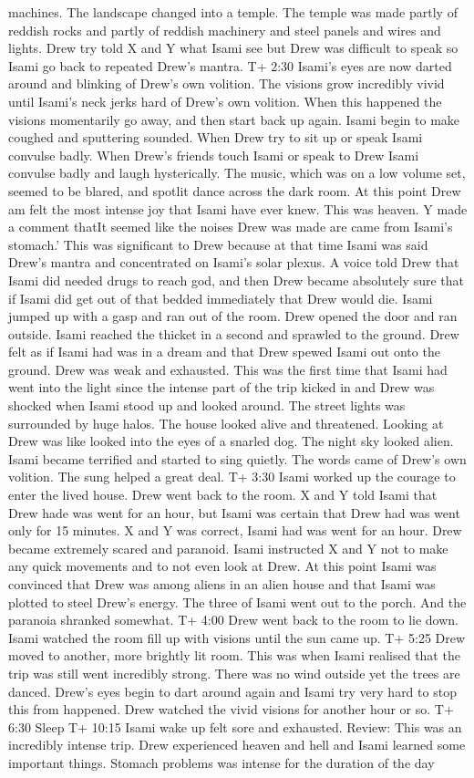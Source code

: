 \documentclass[12pt]{book}
\begin{document}
machines. The landscape changed into a temple. The temple was made partly of reddish rocks and partly of reddish machinery and steel panels and wires and lights. Drew try told X and Y what Isami see but Drew was difficult to speak so Isami go back to repeated Drew's mantra. T+ 2:30 Isami's eyes are now darted around and blinking of Drew's own volition. The visions grow incredibly vivid until Isami's neck jerks hard of Drew's own volition. When this happened the visions momentarily go away, and then start back up again. Isami begin to make coughed and sputtering sounded. When Drew try to sit up or speak Isami convulse badly. When Drew's friends touch Isami or speak to Drew Isami convulse badly and laugh hysterically. The music, which was on a low volume set, seemed to be blared, and spotlit dance across the dark room. At this point Drew am felt the most intense joy that Isami have ever knew. This was heaven. Y made a comment thatIt seemed like the noises Drew was made are came from Isami's stomach.' This was significant to Drew because at that time Isami was said Drew's mantra and concentrated on Isami's solar plexus. A voice told Drew that Isami did needed drugs to reach god, and then Drew became absolutely sure that if Isami did get out of that bedded immediately that Drew would die. Isami jumped up with a gasp and ran out of the room. Drew opened the door and ran outside. Isami reached the thicket in a second and sprawled to the ground. Drew felt as if Isami had was in a dream and that Drew spewed Isami out onto the ground. Drew was weak and exhausted. This was the first time that Isami had went into the light since the intense part of the trip kicked in and Drew was shocked when Isami stood up and looked around. The street lights was surrounded by huge halos. The house looked alive and threatened. Looking at Drew was like looked into the eyes of a snarled dog. The night sky looked alien. Isami became terrified and started to sing quietly. The words came of Drew's own volition. The sung helped a great deal. T+ 3:30 Isami worked up the courage to enter the lived house. Drew went back to the room. X and Y told Isami that Drew hade was went for an hour, but Isami was certain that Drew had was went only for 15 minutes. X and Y was correct, Isami had was went for an hour. Drew became extremely scared and paranoid. Isami instructed X and Y not to make any quick movements and to not even look at Drew. At this point Isami was convinced that Drew was among aliens in an alien house and that Isami was plotted to steel Drew's energy. The three of Isami went out to the porch. And the paranoia shranked somewhat. T+ 4:00 Drew went back to the room to lie down. Isami watched the room fill up with visions until the sun came up. T+ 5:25 Drew moved to another, more brightly lit room. This was when Isami realised that the trip was still went incredibly strong. There was no wind outside yet the trees are danced. Drew's eyes begin to dart around again and Isami try very hard to stop this from happened. Drew watched the vivid visions for another hour or so. T+ 6:30 Sleep T+ 10:15 Isami wake up felt sore and exhausted. Review: This was an incredibly intense trip. Drew experienced heaven and hell and Isami learned some important things. Stomach problems was intense for the duration of the day 
\end{document}
